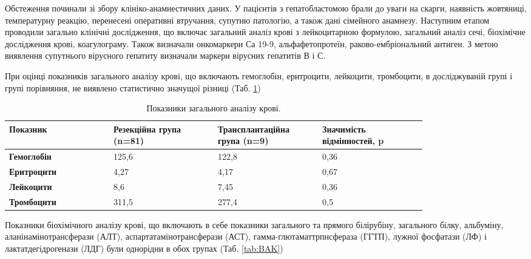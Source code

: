 Обстеження починали зі збору клініко-анамнестичних даних. У пацієнтів з гепатобластомою брали до уваги на скарги, наявність жовтяниці, температурну реакцію, перенесені оперативні втручання, супутню патологію, а також дані сімейного анамнезу. Наступним етапом проводили загально клінічні дослідження, що включає загальний аналіз крові з лейкоцитарною формулою, загальний аналіз сечі, біохімічне дослідження крові, коагулограму. Також визначали онкомаркери Са 19-9, альфафетопротеїн, раково-ембріональний антиген. З метою виявлення супутнього вірусного гепатиту визначали маркери вірусних гепатитів В і С.

При оцінці показників загального аналізу крові, що включають гемоглобін, еритроцити, лейкоцити, тромбоцити, в досліджуваній групі і групі порівняння, не виявлено статистично значущої різниці (Таб. \ref{tab:ZAK})


\begin{table}[]
\centering
\caption{Показники загального аналізу крові.}
\label{tab:ZAK}
\begin{tabular}{|p{0.2\linewidth}|
                 p{0.2\linewidth}|
                 p{0.2\linewidth}|
                 p{0.2\linewidth}|}
\hline
{\color[HTML]{231F20} \textbf{Показник}} &
  {\color[HTML]{231F20} \textbf{Резекційна група (n=81)}} &
  {\color[HTML]{231F20} \textbf{Транс\-план\-таційна група (n=9)}} &
  {\color[HTML]{231F20} \textbf{Значимість відмінностей, p}} \\ \hline
{\color[HTML]{231F20} \textbf{Гемоглобін}} & {\color[HTML]{231F20} 125,6} & {\color[HTML]{231F20} 122,8} & 0,36 \\ \hline
{\color[HTML]{231F20} \textbf{Еритроцити}} & {\color[HTML]{231F20} 4,27}  & {\color[HTML]{231F20} 4,17}  & 0,67 \\ \hline
{\color[HTML]{231F20} \textbf{Лейкоцити}}  & {\color[HTML]{231F20} 8,6}   & {\color[HTML]{231F20} 7,45}  & 0,36 \\ \hline
{\color[HTML]{231F20} \textbf{Тромбоцити}} & {\color[HTML]{231F20} 311,5} & {\color[HTML]{231F20} 277,4} & 0,5  \\ \hline
\end{tabular}
\end{table}

 Показники біохімічного аналізу крові, що включають в себе показники загального та прямого білірубіну, загального білку, альбуміну, аланінамінотрансферази (АЛТ), аспартатамінотрансферази (АСТ), гамма-глютаматтрпнсфераза (ГГТП), лужної фосфатази (ЛФ) і лактатдегідрогенази (ЛДГ) були однорідни в обох групах (Таб. \ref{tab:BAK})

